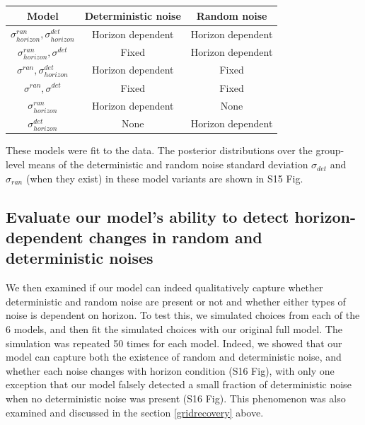 \documentclass[12pt]{article}
\newcommand{\bcaption}[2]{\caption[#1]{\textbf{#1} #2}}
\renewcommand{\includegraphics}[2][]{}
\renewcommand{\caption}[1]{}
\begin{document}
	\begin{table}[h]
		\small
		\centering
		\begin{tabular}{|c|c|c|}
			\hline
			Model & Deterministic noise & Random noise \\
			\hline
			$\sigma^{ran}_{horizon},\sigma^{det}_{horizon}$  & Horizon dependent & Horizon dependent\\
			\hline
			$\sigma^{ran}_{horizon},\sigma^{det}_{}$ & Fixed & Horizon dependent\\
			\hline
			$\sigma^{ran}_{},\sigma^{det}_{horizon}$ & Horizon dependent & Fixed\\
			\hline
			$\sigma^{ran}_{},\sigma^{det}_{}$ & Fixed & Fixed\\
			\hline
			$\sigma^{ran}_{horizon}$ & Horizon dependent & None\\
			\hline
			$\sigma^{det}_{horizon}$ & None & Horizon dependent\\
			\hline
		\end{tabular}
		\caption{Variants of the model.}
		\label{table}	
	\end{table}
	
	These models were fit to the data. The posterior distributions over the group-level means of the deterministic and random noise standard deviation $\sigma_{det}$ and $\sigma_{ran}$ (when they exist) in these model variants are shown in S15 Fig. 
	\newpage

	\subsection{Evaluate our model's ability to detect horizon-dependent changes in random and deterministic noises}		
	We then examined if our model can indeed qualitatively capture whether deterministic and random noise are present or not and whether either types of noise is dependent on horizon. To test this, we simulated choices from each of the 6 models, and then fit the simulated choices with our original full model. The simulation was repeated 50 times for each model. Indeed, we showed that our model can capture both the existence of random and deterministic noise, and whether each noise changes with horizon condition (S16 Fig), with only one exception that our model falsely detected a small fraction of deterministic noise when no deterministic noise was present (S16 Fig). This phenomenon was also examined and discussed in the section \ref{gridrecovery} above.
	
\end{document}
